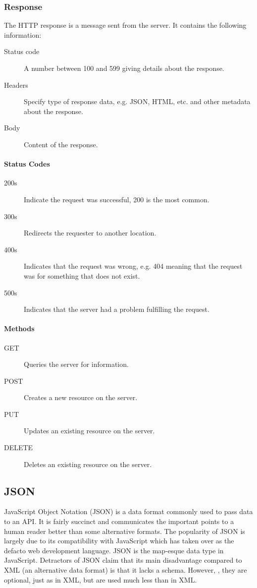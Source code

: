 \documentclass{csse4400}
\begin{document}
\subsubsection{Response}

The HTTP response is a message sent from the server.
It contains the following information:
\begin{description}
    \item[Status code] A number between 100 and 599 giving details about the response.
    \item[Headers] Specify type of response data, e.g. JSON, HTML, etc. and other metadata about the response.
    \item[Body] Content of the response.
\end{description}

\paragraph{Status Codes}
\begin{description}
    \item[200s] Indicate the request was successful, 200 is the most common.
    \item[300s] Redirects the requester to another location.
    \item[400s] Indicates that the request was wrong, e.g. 404 meaning that the request was for something that does not exist.
    \item[500s] Indicates that the server had a problem fulfilling the request.
\end{description}

\paragraph{Methods}
\begin{description}
    \item[GET] Queries the server for information.
    \item[POST] Creates a new resource on the server.
    \item[PUT] Updates an existing resource on the server.
    \item[DELETE] Deletes an existing resource on the server.
\end{description}

\subsection{JSON}
JavaScript Object Notation (JSON) is a data format commonly used to pass data to an API.
It is fairly succinct and communicates the important points to a human reader better than some alternative formats.
The popularity of JSON is largely due to its compatibility with JavaScript which has taken over as the defacto web development language.
JSON is the map-esque data type in JavaScript.
Detractors of JSON claim that its main disadvantage compared to XML (an alternative data format) is that it lacks a schema.
However, ,
they are optional, just as in XML, but are used much less than in XML.
\end{document}
